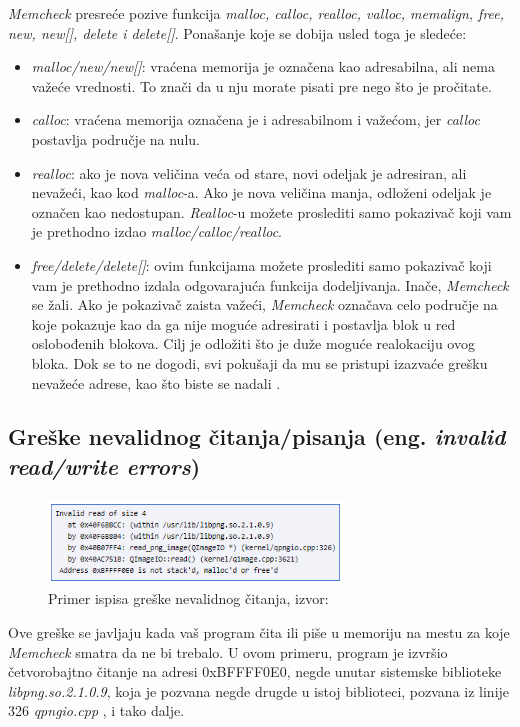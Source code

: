\documentclass[12pt,oneside]{memoir}
\theoremstyle{plain}
\theoremstyle{definition}
\begin{document}
\textit{Memcheck} presreće pozive funkcija \textit{malloc, calloc, realloc, valloc, memalign, free, new, new[], delete i delete[]}. Ponašanje koje  se dobija usled toga je sledeće:
\begin{itemize}
\item \textit{malloc/new/new[]}: vraćena memorija je označena kao adresabilna, ali nema važeće vrednosti. To znači da u nju morate pisati pre nego što je pročitate.
\item \textit{calloc}: vraćena memorija označena je i adresabilnom i važećom, jer \textit{calloc} postavlja područje na nulu.
\item \textit{realloc}: ako je nova veličina veća od stare, novi odeljak je adresiran, ali nevažeći, kao kod \textit{malloc}-a. Ako je nova veličina manja, odloženi odeljak je označen kao nedostupan. \textit{Realloc}-u možete proslediti samo pokazivač koji vam je prethodno izdao \textit{malloc/calloc/realloc}.
\item \textit{free/delete/delete[]}: ovim funkcijama možete proslediti samo pokazivač koji vam je prethodno izdala odgovarajuća funkcija dodeljivanja. Inače, \textit{Memcheck} se žali. Ako je pokazivač zaista važeći, \textit{Memcheck} označava celo područje na koje pokazuje kao da ga nije moguće adresirati i postavlja blok u red oslobođenih blokova. Cilj je odložiti što je duže moguće realokaciju ovog bloka. Dok se to ne dogodi, svi pokušaji da mu se pristupi izazvaće grešku nevažeće adrese, kao što biste se nadali \cite{Memcheck}. 
\end{itemize}

\subsection{Greške nevalidnog čitanja/pisanja (eng. \textit{invalid read/write errors})}
\begin{figure}[!ht]
  \centering
  \includegraphics[width=0.7\textwidth]{invalidReadError.png}
  \caption{Primer ispisa greške nevalidnog čitanja, izvor: \cite{Memcheck}}
  \label{fig:slika2.3}
\end{figure}

Ove greške se javljaju kada vaš program čita ili piše u memoriju na mestu za koje \textit{Memcheck} smatra da ne bi trebalo. U ovom primeru, program je izvršio četvorobajtno čitanje na adresi 0xBFFFF0E0, negde unutar sistemske biblioteke \textit{libpng.so.2.1.0.9}, koja je pozvana negde drugde u istoj biblioteci, pozvana iz linije 326 \textit{qpngio.cpp} , i tako dalje.
\end{document}
